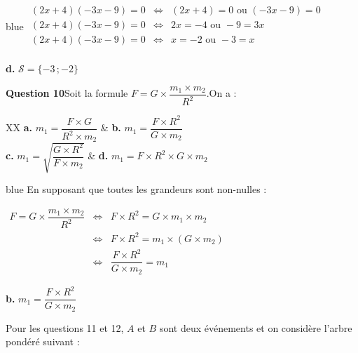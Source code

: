 \documentclass[10pt]{article}
\begin{document}
	\begin{color}{blue}
	\(
	\begin{array}{ccc}
	(2x+4)(-3x-9)=0 &\iff& (2x+4)=0\text{ ou }(-3x-9)=0 \\
	(2x+4)(-3x-9)=0 &\iff& 2x=-4\text{ ou }-9=3x \\
	(2x+4)(-3x-9)=0 &\iff& x=-2\text{ ou }-3=x \\
	\end{array}
	\)
	
	\textbf{d.} $\mathcal{S}=\{-3\,;-2\}$
	
	\end{color}
	
	\medskip
	
	\textbf{Question 10}\quad Soit la formule \quad $F=G\times\dfrac{m_{1}\times m_{2}}{R^{2}}$.\quad On a :
	

	\begin{tblr}{XX}
		\textbf{a.} $m_{1}=\dfrac{F\times G}{R^{2}\times m_{2}}$ & \textbf{b.} $m_{1}=\dfrac{F\times R^{2}}{G\times m_{2}}$\\ 
		\textbf{c.} $m_{1}=\sqrt{\dfrac{G\times R^{2}}{F\times m_{2}}}$ & \textbf{d.} $m_{1}=F\times R^{2}\times G\times m_{2}$ \\
	\end{tblr}


	\begin{color}{blue}
En supposant que toutes les grandeurs sont non-nulles :	
	
	\(
	\begin{array}{ccc}
	F=G\times\dfrac{m_{1}\times m_{2}}{R^{2}} &\iff& F \times R^{2} = G\times m_{1}\times m_{2}\\
	&\iff& F \times R^{2} =  m_{1}\times(G \times m_{2})\\
	&\iff& \dfrac{F \times R^{2}}{G\times m_{2}} = m_{1}
	\end{array}
	\)
	
	\textbf{b.} $m_{1}=\dfrac{F\times R^{2}}{G\times m_{2}}$
	
	\end{color}



	\medskip
	
	Pour les questions 11 et 12, $A$ et $B$ sont deux événements et on considère l'arbre pondéré suivant :
	
\end{document}
